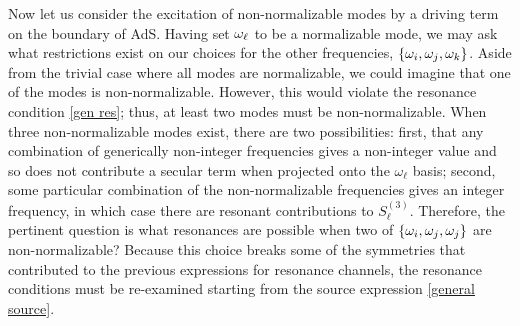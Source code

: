 \documentclass[../PhD.tex]{subfiles}
\begin{document}
Now let us consider the excitation of non-normalizable modes by a driving term on the boundary of AdS. Having set $\omega_\ell$ to be a normalizable mode, we may ask what restrictions exist on our choices for the other frequencies, $\{ \omega_i, \omega_j, \omega_k \}$. Aside from the trivial case where all modes are normalizable, we could imagine that one of the modes is non-normalizable. However, this would violate the resonance condition \eqref{gen res}; thus, at least two modes must be non-normalizable. When three non-normalizable modes exist, there are two possibilities: first, that any combination of generically non-integer frequencies gives a non-integer value and so does not contribute a secular term when projected onto the $\omega_\ell$ basis; second, some particular combination of the non-normalizable frequencies gives an integer frequency, in which case there are resonant contributions to $S^{(3)}_\ell$. Therefore, the pertinent question is what resonances are possible when two of $\{\omega_i, \omega_j, \omega_j\}$ are non-normalizable? Because this choice breaks some of the symmetries that contributed to the previous expressions for resonance channels, the resonance conditions must be re-examined starting from the source expression \eqref{general source}.
\end{document}
